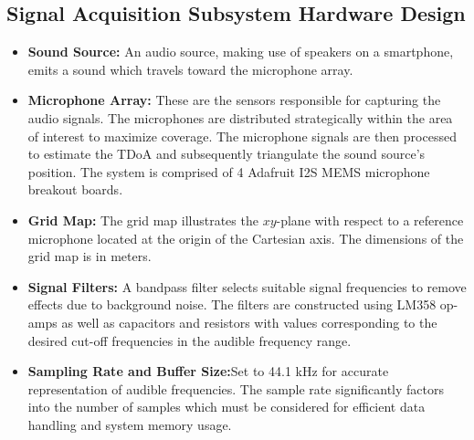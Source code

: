 \documentclass[a4paper,11pt]{article}
\begin{document}
\subsection{Signal Acquisition Subsystem Hardware Design}
\begin{itemize}
	\item 
	\textbf{Sound Source:} An audio source, making use of speakers on a smartphone, emits a sound which travels toward the microphone array. 
	\item 
	\textbf{Microphone Array:} These are the sensors responsible for capturing the audio signals. The microphones are distributed strategically within the area of interest to maximize coverage. The microphone signals are then processed to estimate the TDoA and subsequently triangulate the sound source's position. The system is comprised of 4 Adafruit I2S MEMS microphone breakout boards.
	\item 
	\textbf{Grid Map:} The grid map illustrates the $xy$-plane with respect to a reference microphone located at the origin of the Cartesian axis. The dimensions of the grid map is in meters. 
	\item
	\textbf{Signal Filters:} A bandpass filter selects suitable signal frequencies to remove effects due to background noise. The filters are constructed using LM358 op-amps as well as capacitors and resistors with values corresponding to the desired cut-off frequencies in the audible frequency range. 
	\item
	\textbf{Sampling Rate and Buffer Size:}Set to 44.1 kHz for accurate representation of audible frequencies. The sample rate significantly factors into the number of samples which must be considered for efficient data handling and system memory usage.
\end{itemize}
\end{document}

